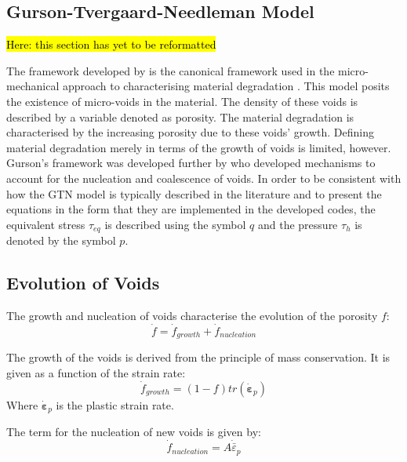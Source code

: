 \documentclass[sn-mathphys,Numbered,draft]{sn-jnl}%
\begin{document}
\subsection{Gurson-Tvergaard-Needleman Model}

\hl{Here: this section has yet to be reformatted}

The framework developed by \citet{gurson_continuum_1977} is the canonical framework used in the micro-mechanical approach to characterising material degradation \cite{besson_continuum_2010,cao_models_2017,tekkaya_damage_2020}. This model posits the existence of micro-voids in the material. The density of these voids is described by a variable denoted as porosity. The material degradation is characterised by the increasing porosity due to these voids' growth. Defining material degradation merely in terms of the growth of voids is limited, however. Gurson’s framework was developed further by \citet{tvergaard_analysis_1984} who developed mechanisms to account for the nucleation and coalescence of voids. In order to be consistent with how the GTN model is typically described in the literature \cite{bettaieb_numerical_2011,achouri_numerical_2013} and to present the equations in the form that they are implemented in the developed codes, the equivalent stress $\tau_{eq}$ is described using the symbol $q$ and the pressure $\tau_h$ is denoted by the symbol $p$. 
\subsection{Evolution of Voids}

The growth and nucleation of voids characterise the evolution of the porosity $f$:
\begin{equation}
	\dot{f}=\dot{f}_{growth}+\dot{f}_{nucleation}	
\end{equation}	

The growth of the voids is derived from the principle of mass conservation. It is given as a function of the strain rate:
\begin{equation}
	\dot{f}_{growth}=\left(1-f\right)tr\left(\dot{\boldsymbol{\varepsilon}}_p\right)	
\end{equation}
 Where $\dot{\boldsymbol{\varepsilon}}_p$ is the plastic strain rate. 
    
The term for the nucleation of new voids is given by:
\begin{equation}
	{\dot{f}}_{nucleation}=A{\dot{\bar{\varepsilon}}}_p	
\end{equation}
\end{document}
